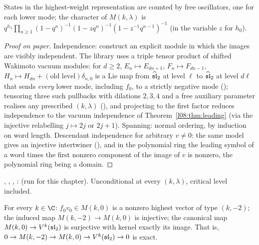 \begin{physics}
States in the highest-weight representation are counted by free oscillators, one for each lower mode;
the character of $M(k,\lambda)$ is $q^{h_\lambda}\prod_{n\ge1}(1-q^n)^{-1}(1-zq^{n})^{-1}(1-z^{-1}q^{n-1})^{-1}$
(in the variable $z$ for $h_0$).
\end{physics}

\begin{proof}[Proof on paper]
Independence: construct an explicit module in which the images are visibly independent. The library
uses a triple tensor product of shifted Wakimoto vacuum modules: for $d\ge2$, $E_n\mapsto E_{dn+1}$,
$F_n\mapsto F_{dn-1}$, $H_n\mapsto H_{dn}+(\text{old level})\delta_{n,0}$ is a Lie map from $\widehat{\mathfrak{sl}}_2$ at
level $\ell$ to $\widehat{\mathfrak{sl}}_2$ at level $d\ell$ that sends \emph{every} lower mode, including $f_0$, to a strictly
negative mode (); tensoring three such pullbacks with dilations
$2,3,4$ and a free auxiliary parameter realises any prescribed $(k,\lambda)$ (),
and projecting to the first factor reduces independence to the vacuum independence of
Theorem~\ref{l08:thm:leading} (via the injective relabelling $j\mapsto 2j$ or $2j+1$). Spanning: normal
ordering, by induction on word length. Descendant independence for arbitrary $v\ne0$: the same model
gives an injective intertwiner (\allowbreak{}\allowbreak{}\allowbreak{}), and in the polynomial ring the
leading symbol of a word times the first nonzero component of the image of $v$ is nonzero, the
polynomial ring being a domain.
\end{proof}

\begin{status}
\allowbreak{}\allowbreak{}\allowbreak{}\allowbreak{}\allowbreak{}, \allowbreak{},
, \allowbreak{}: \lean{[propext, Classical.}\allowbreak{}\allowbreak\lean{sound]}
(run for this chapter). Unconditional at every $(k,\lambda)$, critical level included.
\end{status}

\begin{theorem}\label{l08:thm:exact}
For every $k\in\C$: $f_0v_0\in M(k,0)$ is a nonzero highest vector of type $(k,-2)$; the induced map
$M(k,-2)\to M(k,0)$ is injective; the canonical map $M(k,0)\to V^k(\mathfrak{sl}_2)$ is surjective with kernel
exactly its image. That is, $0\to M(k,-2)\to M(k,0)\to V^k(\mathfrak{sl}_2)\to0$ is exact.
\end{theorem}

